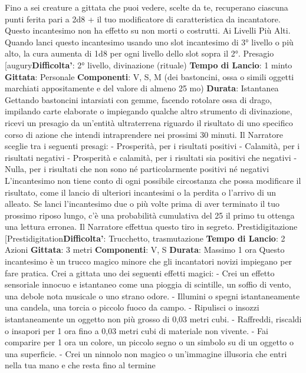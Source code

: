 \begin{multicols}{2}
Fino a sei creature a gittata che puoi vedere, scelte da
te, recuperano ciascuna punti ferita pari a 2d8 + il tuo
modificatore di caratteristica da incantatore. Questo
incantesimo non ha effetto su non morti o costrutti.
Ai Livelli Più Alti. Quando lanci questo incantesimo
usando uno slot incantesimo di 3° livello o più alto, la
cura aumenta di 1d8 per ogni livello dello slot sopra il
2°.
Presagio
[augury\textbf{Difficolta'}:
2° livello, divinazione (rituale)
\textbf{Tempo di Lancio}: 1 minto
\textbf{Gittata}: Personale
\textbf{Componenti}: V, S, M (dei bastoncini, ossa o simili
oggetti marchiati appositamente e del valore di almeno
25 mo)
\textbf{Durata}: Istantanea
Gettando bastoncini intarsiati con gemme, facendo
rotolare ossa di drago, impilando carte elaborate o
impiegando qualche altro strumento di divinazione,
ricevi un presagio da un’entità ultraterrena riguardo il
risultato di uno specifico corso di azione che intendi
intraprendere nei prossimi 30 minuti. Il Narratore sceglie tra i
seguenti presagi:
- Prosperità, per i risultati positivi
- Calamità, per i risultati negativi
- Prosperità e calamità, per i risultati sia positivi che
negativi
- Nulla, per i risultati che non sono né particolarmente
positivi né negativi
L’incantesimo non tiene conto di ogni possibile
circostanza che possa modificare il risultato, come il
lancio di ulteriori incantesimi o la perdita o l’arrivo di un
alleato.
Se lanci l’incantesimo due o più volte prima di aver
terminato il tuo prossimo riposo lungo, c’è una
probabilità cumulativa del 25%
il primo tu ottenga una lettura erronea. Il Narratore effettua
questo tiro in segreto.
Prestidigitazione
[Prestidigitation\textbf{Difficolta'}:
Trucchetto, trasmutazione
\textbf{Tempo di Lancio}: 2 Azioni
\textbf{Gittata}: 3 metri
\textbf{Componenti}: V, S
\textbf{Durata}: Massimo 1 ora
Questo incantesimo è un trucco magico minore che gli
incantatori novizi impiegano per fare pratica. Crei a
gittata uno dei seguenti effetti magici:
- Crei un effetto sensoriale innocuo e istantaneo
come una pioggia di scintille, un soffio di vento, una
debole nota musicale o uno strano odore.
- Illumini o spegni istantaneamente una candela, una
torcia o piccolo fuoco da campo.
- Ripulisci o insozzi istantaneamente un oggetto non
più grosso di 0,03 metri cubi.
- Raffreddi, riscaldi o insapori per 1 ora fino a 0,03
metri cubi di materiale non vivente.
- Fai comparire per 1 ora un colore, un piccolo segno
o un simbolo su di un oggetto o una superficie.
- Crei un ninnolo non magico o un’immagine illusoria
che entri nella tua mano e che resta fino al termine

\end{multicols}
